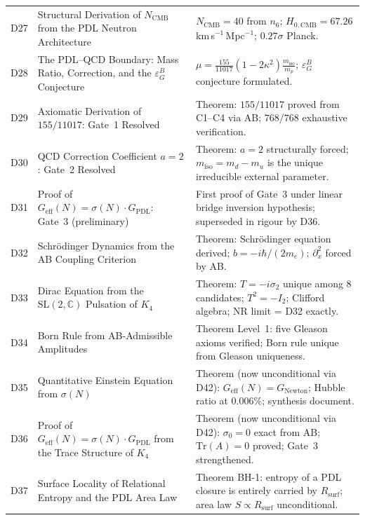 \documentclass[11pt,a4paper]{article}
\theoremstyle{plain}
\theoremstyle{definition}
\theoremstyle{remark}
\newcommand{\Geff}{G_{\mathrm{eff}}}
\newcommand{\GPDL}{G_{\mathrm{PDL}}}
\newcommand{\Rsurf}{R_{\mathrm{surf}}}
\newcommand{\sigmaN}{\sigma(N)}
\newcommand{\epsGeomB}{\varepsilon_G^B}
\begin{document}
\begin{longtable}{L{1.3cm}L{3.8cm}L{8.0cm}}
D27 & Structural Derivation of $N_{\mathrm{CMB}}$ from the PDL Neutron Architecture~\cite{D27} & $N_{\mathrm{CMB}}=40$ from $n_6$; $H_{0,\mathrm{CMB}}=67.26$ km\,s$^{-1}$\,Mpc$^{-1}$; $0.27\sigma$ Planck.\\[0.3em]
D28 & The PDL--QCD Boundary: Mass Ratio, Correction, and the $\epsGeomB$ Conjecture~\cite{D28} & $\mu = \frac{155}{11017}(1-2\kappa^2)\frac{m_{\mathrm{iso}}}{m_p}$; $\epsGeomB$ conjecture formulated.\\[0.3em]
D29 & Axiomatic Derivation of $155/11017$: Gate~1 Resolved~\cite{D29} & \textcolor{proofblue}{Theorem}: $155/11017$ proved from C1--C4 via AB; $768/768$ exhaustive verification.\\[0.3em]
D30 & QCD Correction Coefficient $a=2$: Gate~2 Resolved~\cite{D30} & \textcolor{proofblue}{Theorem}: $a=2$ structurally forced; $m_{\mathrm{iso}}=m_d-m_u$ is the unique irreducible external parameter.\\[0.3em]
D31 & Proof of $\Geff(N)=\sigmaN\cdot\GPDL$: Gate~3 (preliminary)~\cite{D31} & First proof of Gate~3 under linear bridge inversion hypothesis; superseded in rigour by D36.\\[0.3em]
D32 & Schr\"odinger Dynamics from the AB Coupling Criterion~\cite{D32} & \textcolor{proofblue}{Theorem}: Schr\"odinger equation derived; $b=-i\hbar/(2m_e)$; $\partial_x^2$ forced by AB.\\[0.3em]
D33 & Dirac Equation from the $\mathrm{SL}(2,\mathbb{C})$ Pulsation of $K_4$~\cite{D33} & \textcolor{proofblue}{Theorem}: $T=-i\sigma_2$ unique among 8 candidates; $T^2=-I_2$; Clifford algebra; NR limit = D32 exactly.\\[0.3em]
D34 & Born Rule from AB-Admissible Amplitudes~\cite{D34} & \textcolor{proofblue}{Theorem} Level~1: five Gleason axioms verified; Born rule unique from Gleason uniqueness.\\[0.3em]
D35 & Quantitative Einstein Equation from $\sigmaN$~\cite{D35} & \textcolor{proofblue}{Theorem} (now unconditional via D42): $G_{\mathrm{eff}}(N)=G_{\mathrm{Newton}}$; Hubble ratio at $0.006\%$; synthesis document.\\[0.3em]
D36 & Proof of $\Geff(N)=\sigmaN\cdot\GPDL$ from the Trace Structure of $K_4$~\cite{D36} & \textcolor{proofblue}{Theorem} (now unconditional via D42): $\sigma_0=0$ exact from AB; $\mathrm{Tr}(A)=0$ proved; Gate~3 strengthened.\\[0.4em]
D37 & Surface Locality of Relational Entropy and the PDL Area Law~\cite{D37} & \textcolor{proofblue}{Theorem BH-1}: entropy of a PDL closure is entirely carried by $\Rsurf$; area law $S\propto\Rsurf$ unconditional.\\[0.3em]

\end{longtable}
\end{document}
